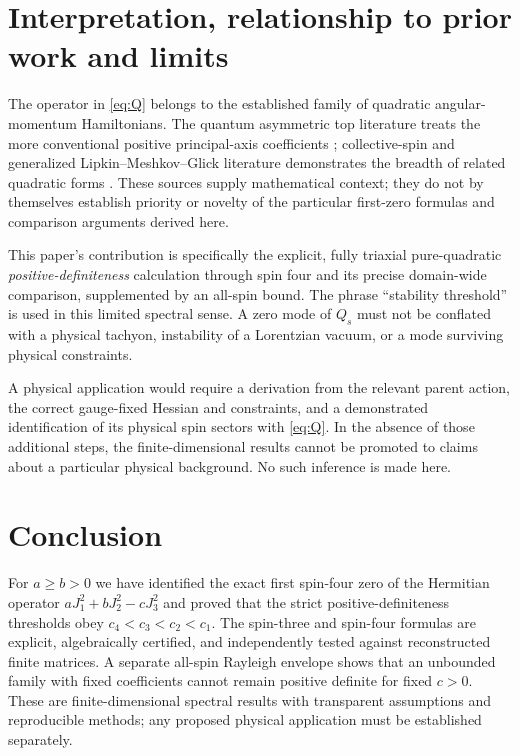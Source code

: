 \documentclass[11pt,a4paper]{article}
\begin{document}
\section{Interpretation, relationship to prior work and limits}\label{sec:scope}
The operator in \eqref{eq:Q} belongs to the established family of
quadratic angular-momentum Hamiltonians. The quantum asymmetric
top literature treats the more conventional positive principal-axis
coefficients \cite{breev2023}; collective-spin and generalized
Lipkin--Meshkov--Glick literature demonstrates the breadth of
related quadratic forms \cite{opatrny2018,ribeiro2008}.
These sources supply mathematical context; they do not by themselves
establish priority or novelty of the particular first-zero formulas
and comparison arguments derived here.

This paper's contribution is specifically the explicit, fully
triaxial pure-quadratic \emph{positive-definiteness} calculation
through spin four and its precise domain-wide comparison,
supplemented by an all-spin bound. The phrase ``stability
threshold'' is used in this limited spectral sense. A zero mode
of $Q_s$ must not be conflated with a physical tachyon,
instability of a Lorentzian vacuum, or a mode surviving
physical constraints.

A physical application would require a derivation from the
relevant parent action, the correct gauge-fixed Hessian and
constraints, and a demonstrated identification of its physical
spin sectors with \eqref{eq:Q}. In the absence of those additional
steps, the finite-dimensional results cannot be promoted to claims
about a particular physical background. No such inference is made here.

\section{Conclusion}
For $a\geq b>0$ we have identified the exact first spin-four
zero of the Hermitian operator $aJ_1^2+bJ_2^2-cJ_3^2$ and
proved that the strict positive-definiteness thresholds obey
$c_4<c_3<c_2<c_1$. The spin-three and spin-four formulas are
explicit, algebraically certified, and independently tested
against reconstructed finite matrices. A separate all-spin
Rayleigh envelope shows that an unbounded family with fixed
coefficients cannot remain positive definite for fixed $c>0$.
These are finite-dimensional spectral results with transparent
assumptions and reproducible methods; any proposed physical
application must be established separately.
\end{document}
